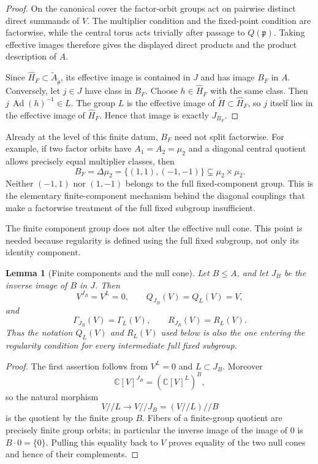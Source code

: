 \documentclass[10pt,a4paper]{amsart}
\numberwithin{equation}{section}
\newtheorem{lemma}[theorem]{Lemma}
\newcommand{\C}{\mathbb C}
\newcommand{\Ad}{\operatorname{Ad}}
\newcommand{\fp}{\mathfrak p}
\newcommand{\sslash}{/\!\!/}
\begin{document}
\begin{proof}
On the canonical cover the factor-orbit groups act on pairwise distinct direct
summands of $V$.  The multiplier condition and the fixed-point condition are
factorwise, while the central torus acts trivially after passage to $Q(\fp)$.
Taking effective images therefore gives the displayed direct products and the
product description of $A$.

Since $\widehat H_F\subset\widetilde A_{\widetilde\theta}$, its effective
image is contained in $J$ and has image $B_F$ in $A$.  Conversely, let
$j\in J$ have class in $B_F$.  Choose $h\in\widehat H_F$ with the same class.
Then $j\,\Ad(h)^{-1}\in L$.  The group $L$ is the effective image of
$\widetilde H\subset\widehat H_F$, so $j$ itself lies in the effective image
of $\widehat H_F$.  Hence that image is exactly $J_{B_F}$.
\end{proof}

Already at the level of this finite datum, $B_F$ need not split factorwise.
For example, if two factor orbits have $A_1=A_2=\mu_2$ and a diagonal
central quotient allows precisely equal multiplier classes, then
\[
 B_F=\Delta\mu_2=\{(1,1),(-1,-1)\}
       \subsetneq\mu_2\times\mu_2.
\]
Neither $(-1,1)$ nor $(1,-1)$ belongs to the full fixed-component group.  This
is the elementary finite-component mechanism behind the diagonal couplings
that make a factorwise treatment of the full fixed subgroup insufficient.

The finite component group does not alter the effective null cone.  This point
is needed because regularity is defined using the full fixed subgroup, not only
its identity component.

\begin{lemma}[Finite components and the null cone]
\label{lem:finite-components-nullcone}
Let $B\leq A$, and let $J_B$ be the inverse image of $B$ in $J$.  Then
\[
 V^{J_B}=V^L=0,\qquad Q_{J_B}(V)=Q_L(V)=V,
\]
and
\[
 \Gamma_{J_B}(V)=\Gamma_L(V),\qquad
 R_{J_B}(V)=R_L(V).
\]
Thus the notation $Q_L(V)$ and $R_L(V)$ used below is also the one entering the
regularity condition for every intermediate full fixed subgroup.
\end{lemma}

\begin{proof}
The first assertion follows from $V^L=0$ and $L\subset J_B$.  Moreover
\[
 \C[V]^{J_B}=(\C[V]^L)^B,
\]
so the natural morphism
\[
 V\sslash L\longrightarrow V\sslash J_B=(V\sslash L)\sslash B
\]
is the quotient by the finite group $B$.  Fibers of a finite-group quotient are
precisely finite group orbits; in particular the inverse image of the image of
$0$ is $B\cdot0=\{0\}$.  Pulling this equality back to $V$ proves equality of
the two null cones and hence of their complements.
\end{proof}
\end{document}
